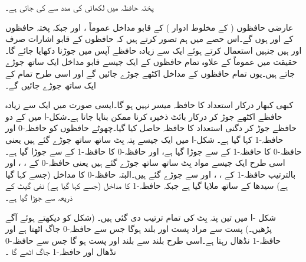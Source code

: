 پختہ حافظہ میں لکھائی  کی مدد سے کی جاتی ہے۔
	

عارضی حافظوں ( کے   مخلوط  ادوار ) کے قابو  مداخل   عموماً ،   اور    جبکہ پختہ حافظوں کے    اور    ہوں گے۔اس حصے میں  ہم تصور کرتے ہیں کہ  حافظوں   کے قابو  اشارات صرف  اور     ہیں  جنہیں  استعمال کرتے ہوئے   ایک سے زیادہ حافظے آپس میں جوڑنا دکھایا جائے گا۔حقیقت میں  عموماً    کے علاوہ تمام حافظوں کے ایک جیسے قابو مداخل  ایک ساتھ جوڑے جاتے ہیں۔یوں تمام حافظوں  کے     مداخل اکٹھے جوڑے جائیں گے اور اسی طرح    تمام کے      ایک ساتھ جوڑے جائیں گے۔

کبھی کبھار درکار استعداد کا حافظہ میسر نہیں ہو گا۔ایسی صورت میں  ایک سے زیادہ حافظے اکٹھے جوڑ کر درکار بائٹ ذخیرہ کرنا ممکن بنایا جاتا ہے۔شکل-ا میں      کے دو حافظے جوڑ کر دگنی استعداد کا   حافظہ حاصل کیا گیا۔چھوٹے حافظوں کو حافظہ-0 اور حافظہ-1 کہا گیا ہے۔ شکل-ا  میں ایک جیسے  پتہ بِٹ ساتھ ساتھ  جوڑے گئے ہیں یعنی حافظہ-0 کا   حافظہ-1 کے   سے جوڑا گیا ہے، اور  حافظہ-0 کا   حافظہ-1 کے   سے جوڑا گیا ہے۔اسی طرح  ایک جیسے  مواد بِٹ   ساتھ  ساتھ جوڑے گئے ہیں یعنی حافظہ-0 کے ، ،   اور   بالترتیب حافظہ-1 کے ، ،   اور   سے جوڑے گئے ہیں۔البتہ حافظہ-0 کا  مداخل (جسے  کہا گیا ہے)   سیدھا  کے ساتھ ملایا گیا ہے جبکہ  حافظہ-1 کا  مداخل (جسے  کہا گیا ہے) نفی گیٹ کے ذریعہ   سے جوڑا گیا ہے۔



شکل -ا میں تین  پتہ  بِٹ کی تمام ترتیب  دی  گئی ہیں۔ (شکل   کو دیکھتے ہوئے آگے پڑھیں۔) پست   سے مراد  پست     اور بلند  ہوگا جس سے حافظہ-0  جاگ  اٹھتا ہے  اور حافظہ-1 نڈھال  رہتا ہے۔اسی طرح بلند   سے   بلند اور  پست ہو گا  جس سے حافظہ-0  نڈھال   اور حافظہ-1 جاگ اٹھے گا  ۔

